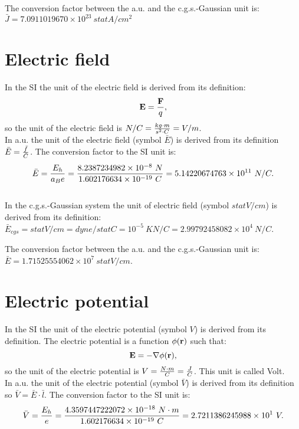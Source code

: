 \documentclass[12pt,a4paper]{article}
\def\barf{8.2387234982\times 10^{-8}}
\def\baru{4.3597447222072\times 10^{-18}}
\def\barc{1.602176634\times 10^{-19}}
\def\bare{5.14220674763\times 10^{11}}
\def\barphi{2.7211386245988\times 10^{1}}
\def\etoe{2.99792458082\times 10^{4}}
\def\barcurcgs{7.0911019670\times 10^{23}}
\def\barecgs{1.71525554062\times 10^{7}}
\begin{document}
{\color{green} 
The conversion factor between the a.u. and the c.g.s.-Gaussian unit
is: $\bar J = \barcurcgs\ statA/cm^2 $
\\

}

\newpage
\section{\color{coral}Electric field}
In the SI the unit of the electric field is derived from 
its definition:
\begin{equation}
{\bf E}={{\bf F} \over q},
\end{equation}
so the unit of the electric field is $N/C= {kg\cdot m \over s^2 \cdot C}
=V/m$.
\\

{\color{web-blue} In a.u. the unit of the electric field (symbol $\bar E$) 
is derived from its definition $\bar E={\bar f \over \bar C}$. The 
conversion factor to the SI unit is:
\begin{equation}
\bar E= {E_h\over a_B e}= {\barf\ N \over \barc\ C}= \bare\ N/C. 
\end{equation}
}
\\

{\color{orange} In the c.g.s.-Gaussian system the unit of electric field
(symbol $statV/cm$) is derived from its definition:
$\bar E_{cgs}=statV/cm=dyne / statC = {10^{-5}\ K } N/C=\etoe\ N/C$. 
\\
}

{\color{green} 
The conversion factor between the a.u. and the c.g.s.-Gaussian unit
is: $\bar E = \barecgs \ statV/cm$.
}

\newpage
\section{\color{coral}Electric potential}
In the SI the unit of the electric potential (symbol $V$)
is derived from its definition. The electric 
potential is a function $\phi({\bf r})$ such that:
\begin{equation}
{\bf E}=- \nabla \phi({\bf r}),
\end{equation}
so the unit of the electric potential is $V={N \cdot m \over C}={J\over C}$. 
This unit is called Volt.
\\

{\color{web-blue} In a.u. the unit of the electric potential 
(symbol $\bar V$) 
is derived from its definition so $\bar V={\bar E \cdot \bar l}$. 
The conversion factor to the SI unit is:
\begin{equation}
\bar V= {E_h\over e}=
{\baru\ N\cdot m\over \barc\ C} =\barphi\ V.
\end{equation}
}
\\
\end{document}
